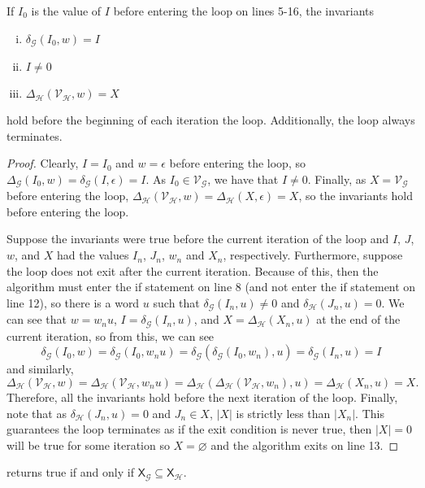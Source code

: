 \documentclass[hidelinks]{article}
\newcommand{\Gc}{\mathcal{G}}  %
\newcommand{\Hc}{\mathcal{H}}  %
\newcommand{\Vc}{\mathcal{V}}
\newcommand{\shift}[1]{\mathsf{X}_{#1}}
\theoremstyle{definition}
\begin{document}
\begin{lemma}\label{invariants}
    If \(I_0\) is the value of \(I\) before entering the loop on lines 5-16, the invariants 
    \begin{enumerate}[(i)]
        \item \(\delta_\Gc(I_0, w) = I\)
        \item \(I \neq 0\)
        \item \(\Delta_\Hc(\Vc_\Hc, w) = X\)
    \end{enumerate}
    hold before the beginning of each iteration the loop. 
    Additionally, the loop always terminates.
\end{lemma}

\begin{proof}
    Clearly, \(I = I_0\) and \(w = \epsilon\) before entering the loop, so \(\Delta_\Gc(I_0, w) = \delta_\Gc(I, \epsilon) = I\).
    As \(I_0 \in \Vc_\Gc\), we have that \(I \neq 0\). Finally, as \(X = \Vc_\Gc\) before 
    entering the loop, \(\Delta_\Hc(\Vc_\Hc, w) = \Delta_\Hc(X, \epsilon) = X\), so the invariants hold 
    before entering the loop.

    Suppose the invariants were true before the current iteration of the loop and \(I\), \(J\), \(w\), and \(X\)
    had the values \(I_n\), \(J_n\), \(w_n\) and \(X_n\), respectively. Furthermore, suppose the loop does not exit
    after the current iteration. Because of this, then the algorithm must enter the 
    if statement on line 8 (and not enter the if statement on line 12), so there is a word \(u\) such that \(\delta_\Gc(I_n, u) \neq 0\)
    and \(\delta_\Hc(J_n, u) = 0\). We can see that \(w = w_n u\), \(I = \delta_\Gc(I_n, u)\), and 
    \(X = \Delta_\Hc(X_n, u)\) at the end of the current iteration, so from this, we can see 
    \[\delta_\Gc(I_0, w) = \delta_\Gc(I_0, w_n u) = \delta_\Gc(\delta_\Gc(I_0, w_n), u) = \delta_\Gc(I_n, u) = I\]
    and similarly,
    \[\Delta_\Hc(\Vc_\Hc, w) = \Delta_\Hc(\Vc_\Hc, w_n u) = \Delta_\Hc(\Delta_\Hc(\Vc_\Hc, w_n), u) = \Delta_\Hc(X_n, u) = X.\]
    Therefore, all the invariants hold before the next iteration of the loop.
    Finally, note that as \(\delta_\Hc(J_n, u) = 0\) and \(J_n \in X\), \(|X|\) is strictly less 
    than \(|X_n|\). This guarantees the loop terminates as if the exit condition is never 
    true, then \(|X| = 0\) will be true for some iteration so \(X = \varnothing\) and the algorithm exits on line 13. 
\end{proof}

\begin{theorem}
     returns true if and only if \(\shift{\Gc} \subseteq \shift{\Hc}\).
\end{theorem}
\end{document}
